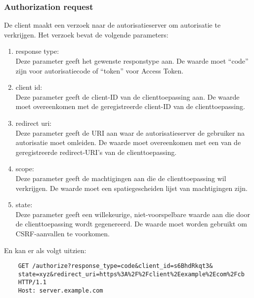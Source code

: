 \subsubsection{Authorization request}%
\label{subsubsec:authorization-request}
De client maakt een verzoek naar de autorisatieserver om autorisatie te verkrijgen. Het verzoek bevat de volgende parameters:
\begin{enumerate}[label=\textbf{-}]
    \item response type: \\
    Deze parameter geeft het gewenste responstype aan. De waarde moet ``code'' zijn voor autorisatiecode of ``token'' voor Access Token.
  
    \item client id: \\
    Deze parameter geeft de client-ID van de clienttoepassing aan. De waarde moet overeenkomen met de geregistreerde client-ID van de clienttoepassing.
  
    \item redirect uri: \\
    Deze parameter geeft de URI aan waar de autorisatieserver de gebruiker na autorisatie moet omleiden. De waarde moet overeenkomen met een van de geregistreerde redirect-URI's van de clienttoepassing.
  
    \item scope: \\
    Deze parameter geeft de machtigingen aan die de clienttoepassing wil verkrijgen. De waarde moet een spatiegescheiden lijst van machtigingen zijn.
  
    \item state: \\
    Deze parameter geeft een willekeurige, niet-voorspelbare waarde aan die door de clienttoepassing wordt gegenereerd. De waarde moet worden gebruikt om CSRF-aanvallen te voorkomen.
  \end{enumerate}
  En kan er als volgt uitzien:
  \begin{verbatim}
    GET /authorize?response_type=code&client_id=s6BhdRkqt3&
    state=xyz&redirect_uri=https%3A%2F%2Fclient%2Eexample%2Ecom%2Fcb
    HTTP/1.1
    Host: server.example.com
  \end{verbatim}
    

